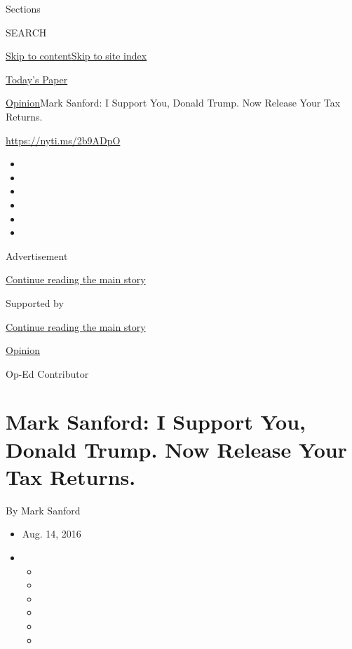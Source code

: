 Sections

SEARCH

\protect\hyperlink{site-content}{Skip to
content}\protect\hyperlink{site-index}{Skip to site index}

\href{https://myaccount.nytimes.com/auth/login?response_type=cookie\&client_id=vi}{}

\href{https://www.nytimes.com/section/todayspaper}{Today's Paper}

\href{/section/opinion}{Opinion}\textbar{}Mark Sanford: I Support You,
Donald Trump. Now Release Your Tax Returns.

\url{https://nyti.ms/2b9ADpO}

\begin{itemize}
\item
\item
\item
\item
\item
\item
\end{itemize}

Advertisement

\protect\hyperlink{after-top}{Continue reading the main story}

Supported by

\protect\hyperlink{after-sponsor}{Continue reading the main story}

\href{/section/opinion}{Opinion}

Op-Ed Contributor

\hypertarget{mark-sanford-i-support-you-donald-trump-now-release-your-tax-returns}{%
\section{Mark Sanford: I Support You, Donald Trump. Now Release Your Tax
Returns.}\label{mark-sanford-i-support-you-donald-trump-now-release-your-tax-returns}}

By Mark Sanford

\begin{itemize}
\item
  Aug. 14, 2016
\item
  \begin{itemize}
  \item
  \item
  \item
  \item
  \item
  \item
  \end{itemize}
\end{itemize}

